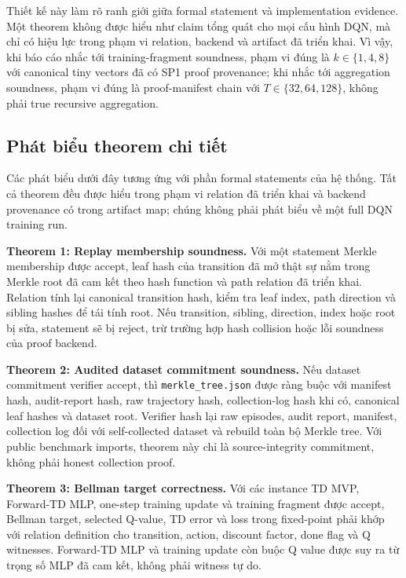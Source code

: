 \documentclass[12pt,a4paper,oneside]{report}
\newcommand{\code}[1]{\texttt{#1}}
\begin{document}
Thiết kế này làm rõ ranh giới giữa formal statement và implementation evidence. Một theorem không được hiểu như claim tổng quát cho mọi cấu hình DQN, mà chỉ có hiệu lực trong phạm vi relation, backend và artifact đã triển khai. Vì vậy, khi báo cáo nhắc tới training-fragment soundness, phạm vi đúng là \(k \in \{1,4,8\}\) với canonical tiny vectors đã có SP1 proof provenance; khi nhắc tới aggregation soundness, phạm vi đúng là proof-manifest chain với \(T \in \{32,64,128\}\), không phải true recursive aggregation.

\subsection*{Phát biểu theorem chi tiết}

Các phát biểu dưới đây tương ứng với phần formal statements của hệ thống. Tất cả theorem đều được hiểu trong phạm vi relation đã triển khai và backend provenance có trong artifact map; chúng không phải phát biểu về một full DQN training run.

\textbf{Theorem 1: Replay membership soundness.} Với một statement Merkle membership được accept, leaf hash của transition đã mở thật sự nằm trong Merkle root đã cam kết theo hash function và path relation đã triển khai. Relation tính lại canonical transition hash, kiểm tra leaf index, path direction và sibling hashes để tái tính root. Nếu transition, sibling, direction, index hoặc root bị sửa, statement sẽ bị reject, trừ trường hợp hash collision hoặc lỗi soundness của proof backend.

\textbf{Theorem 2: Audited dataset commitment soundness.} Nếu dataset commitment verifier accept, thì \code{merkle\_tree.json} được ràng buộc với manifest hash, audit-report hash, raw trajectory hash, collection-log hash khi có, canonical leaf hashes và dataset root. Verifier hash lại raw episodes, audit report, manifest, collection log đối với self-collected dataset và rebuild toàn bộ Merkle tree. Với public benchmark imports, theorem này chỉ là source-integrity commitment, không phải honest collection proof.

\textbf{Theorem 3: Bellman target correctness.} Với các instance TD MVP, Forward-TD MLP, one-step training update và training fragment được accept, Bellman target, selected Q-value, TD error và loss trong fixed-point phải khớp với relation definition cho transition, action, discount factor, done flag và Q witnesses. Forward-TD MLP và training update còn buộc Q value được suy ra từ trọng số MLP đã cam kết, không phải witness tự do.
\end{document}
